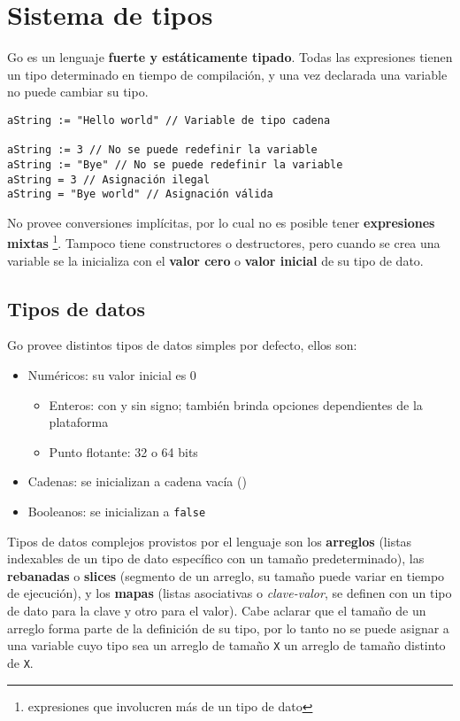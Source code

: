 \section{Sistema de tipos}

Go es un lenguaje \textbf{fuerte y estáticamente tipado}. Todas las expresiones tienen un tipo determinado en tiempo de compilación, y una vez declarada una variable no puede cambiar su tipo.

\vspace*{5mm}
\begin{lstlisting}[title=\centering Ejemplos de asignaciones válidas e inválidas (nótese el uso de los operadores \dq{:=} y \dq{=})]
aString := "Hello world" // Variable de tipo cadena

aString := 3 // No se puede redefinir la variable
aString := "Bye" // No se puede redefinir la variable
aString = 3 // Asignación ilegal
aString = "Bye world" // Asignación válida

\end{lstlisting}

No provee conversiones implícitas, por lo cual no es posible tener \textbf{expresiones mixtas} \footnote{expresiones que involucren más de un tipo de dato}. Tampoco tiene constructores o destructores, pero cuando se crea una variable se la inicializa con el \textbf{valor cero} o \textbf{valor inicial} de su tipo de dato.

\subsection{Tipos de datos}

Go provee distintos tipos de datos simples por defecto, ellos son:

\begin{itemize}
    \item Numéricos: su valor inicial es 0
    \begin{itemize}
        \item Enteros: con y sin signo; también brinda opciones dependientes de la plataforma
        \item Punto flotante: 32 o 64 bits
    \end{itemize}
    \item Cadenas: se inicializan a cadena vacía (\dq{})
    \item Booleanos: se inicializan a \texttt{false} 
\end{itemize}

Tipos de datos complejos provistos por el lenguaje son los \textbf{arreglos} (listas indexables de un tipo de dato específico con un tamaño predeterminado), las \textbf{rebanadas} o \textbf{slices} (segmento de un arreglo, su tamaño puede variar en tiempo de ejecución), y los \textbf{mapas} (listas asociativas o \emph{clave-valor}, se definen con un tipo de dato para la clave y otro para el valor). Cabe aclarar que el tamaño de un arreglo forma parte de la definición de su tipo, por lo tanto no se puede asignar a una variable cuyo tipo sea un arreglo de tamaño \texttt{X} un arreglo de tamaño distinto de \texttt{X}.

